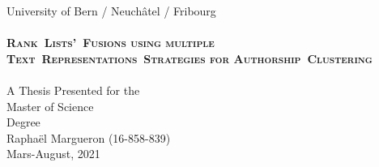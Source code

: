 \begin{titlepage}
  \vspace*{\fill}
  \begin{center}
    {\Large University of Bern / Neuchâtel / Fribourg}
    \\[3.0cm]
    \makebox[\linewidth]{\rule{0.8\paperwidth}{0.4pt}}
    \\[0.9cm]
    {\huge \bfseries \scshape Rank~Lists'~Fusions using multiple Text~Representations~Strategies for Authorship~Clustering}
    \\[0.5cm]
    \makebox[\linewidth]{\rule{0.8\paperwidth}{0.4pt}}
    \\[1.0cm]
    {\large A Thesis Presented for the \\  Master of Science \\ Degree}
    \\[3.5cm]
    {\Large Raphaël Margueron (16-858-839)}
    \\[0.8cm]
    {\large Mars-August, 2021}
    \\[5.0cm]
  \end{center}
  \vspace*{\fill}
\end{titlepage}
